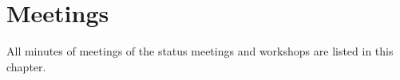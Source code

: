 \documentclass[hsr-ba,english]{hgbthesis}
\begin{document}





\chapter{Meetings}

All minutes of meetings of the status meetings and workshops are listed in
this chapter.







%
%



\printglossaries


\MakeBibliography
\end{document}
